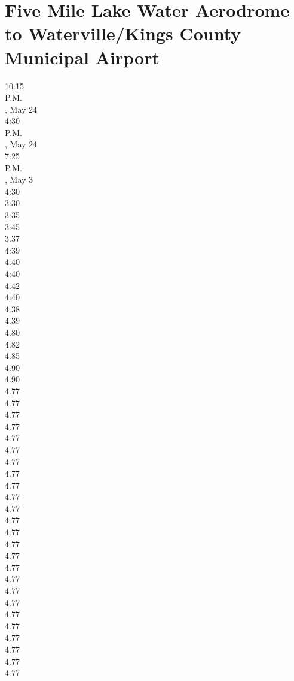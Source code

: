 \documentclass[smalldemyvopaper,11pt,twoside,onecolumn,openright,extrafontsizes]{memoir}
\begin{document}
\chapter{Five Mile Lake Water Aerodrome to Waterville/Kings County Municipal Airport}
10:15
\\P.M.
\\, May 24
\\4:30
\\P.M.
\\, May 24
\\7:25
\\P.M.
\\, May 3
\\4:30
\\3:30
\\3:35
\\3:45
\\3.37
\\4:39
\\4.40
\\4:40
\\4.42
\\4:40
\\4.38
\\4.39
\\4.80
\\4.82
\\4.85
\\4.90
\\4.90
\\4.77
\\4.77
\\4.77
\\4.77
\\4.77
\\4.77
\\4.77
\\4.77
\\4.77
\\4.77
\\4.77
\\4.77
\\4.77
\\4.77
\\4.77
\\4.77
\\4.77
\\4.77
\\4.77
\\4.77
\\4.77
\\4.77
\\4.77
\\4.77
\\4.77
\end{document}
